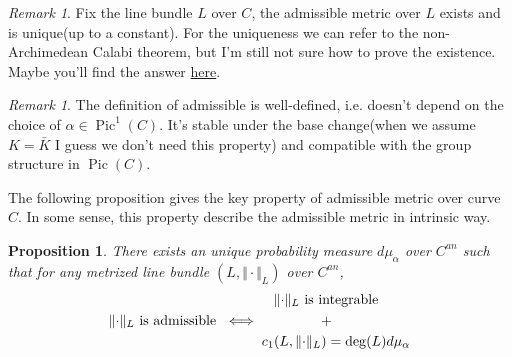 \documentclass[reqno,11pt]{amsart}
\numberwithin{equation}{section}
\theoremstyle{plain}
\newtheorem{proposition}[theorem]{Proposition}
\theoremstyle{plain}
\numberwithin{equation}{section}
\theoremstyle{remark}
\newtheorem{remark}[theorem]{Remark}
\DeclareMathOperator{\Pic}{\operatorname{Pic}}
\newcommand{\norm}[1]{\Vert{#1}\Vert}
\begin{document}
\begin{center}
\end{center}
\begin{remark}
Fix the line bundle $L$ over $C$, the admissible metric over $L$ exists and is unique(up to a constant). For the uniqueness we can refer to the non-Archimedean Calabi theorem, but I'm still not sure how to prove the existence. Maybe you'll find the answer \href{http://qirui.li/main.pdf}{here}.
\end{remark}
\begin{remark}
The definition of admissible is well-defined, i.e. doesn't depend on the choice of $\alpha \in \Pic^1(C)$. It's stable under the base change(when we assume $K=\bar{K}$ I guess we don't need this property) and compatible with the group structure in $\Pic(C)$.
\end{remark}
The following proposition gives the key property of admissible metric over curve $C$. In some sense, this property describe the admissible metric in intrinsic way.
\begin{proposition}
There exists an unique probability measure $d\mu_{\alpha}$ over $C^{an}$ such that for any metrized line bundle $(L,\norm{\cdot}_L)$ over $C^{an}$,
$$\norm{\cdot}_L \text{ is admissible } \iff \begin{aligned}
&\hspace{0.3cm}\norm{\cdot}_L \text{ is integrable}\\
&\hspace{1.5cm}+\\
& c_1(L,\norm{\cdot}_L)= \deg (L) d\mu_{\alpha}
\end{aligned}$$
\end{proposition}
\end{document}
